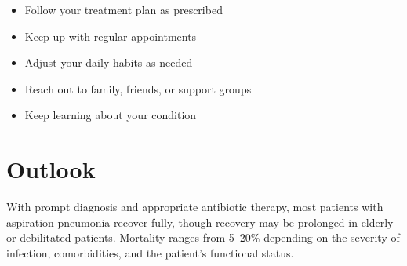 \begin{itemize}[noitemsep]
  \item Follow your treatment plan as prescribed
  \item Keep up with regular appointments
  \item Adjust your daily habits as needed
  \item Reach out to family, friends, or support groups
  \item Keep learning about your condition
\end{itemize}

\section{Outlook}
With prompt diagnosis and appropriate antibiotic therapy, most patients with aspiration pneumonia recover fully, though recovery may be prolonged in elderly or debilitated patients. Mortality ranges from 5--20\% depending on the severity of infection, comorbidities, and the patient's functional status.

